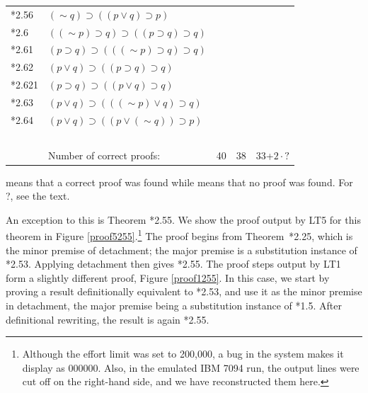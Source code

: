 \documentclass[journal]{IEEEtran}
\begin{document}
\begin{table}[h]
\begin{tabular}{lllll}
*2.56 & $ (\sim q) \supset ((p \vee q) \supset p) $ & \Y & \ & \N \\
*2.6 & $( (\sim p) \supset q) \supset ((p \supset q) \supset q) $ & \N & \ & \N \\
*2.61 & $(p \supset q) \supset (( (\sim p) \supset q) \supset q)$ & \Y & \ & \Y \\
*2.62 & $(p \vee q) \supset ((p \supset q) \supset q) $ & \Y & \ & \Y \\
*2.621 & $(p \supset q) \supset ((p \vee q) \supset q) $ & \Y & \ & \Y \\
*2.63 & $(p \vee q) \supset (( (\sim p) \vee q) \supset q) $ & \Y & \ & \Y \\
*2.64 & $(p \vee q) \supset ((p \vee (\sim q)) \supset p) $ & \N & \ & \N \\
\ & \ & \ & \ & \ \\
\ & Number of correct proofs: & 40 & 38 & 33+$2\cdot ?$ \\
\bottomrule
\end{tabular}
\begin{center} \Y{} means that a correct proof was found while \N{} means that no
proof was found.  For ?, see the text.
\end{center}
\end{table}

An exception to this is Theorem *2.55.  We show the proof output by LT5
for this theorem in Figure
\ref{proof5255}.\footnote{Although the effort limit was set to 200,000, a bug in the system makes it display as 000000.  Also, in the emulated IBM 7094 run, the output lines were cut off on the right-hand side, and we have reconstructed them here.}
The proof begins from Theorem~*2.25, which is the minor premise
of detachment; the major premise is a substitution instance of
*2.53.  Applying detachment then gives *2.55.  The proof steps
output by LT1 form a slightly different proof, Figure \ref{proof1255}.
In this case, we start by proving a result definitionally equivalent to *2.53, and
use it as the minor premise in detachment, the major premise being a substitution
instance of *1.5.  After definitional rewriting, the result is again *2.55.
\end{document}
